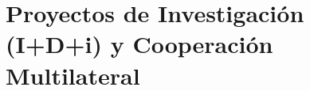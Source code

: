 \documentclass[a4paper]{article}
\begin{document}
    

\section{Proyectos de Investigación (I+D+i) y Cooperación Multilateral}
\end{document}
